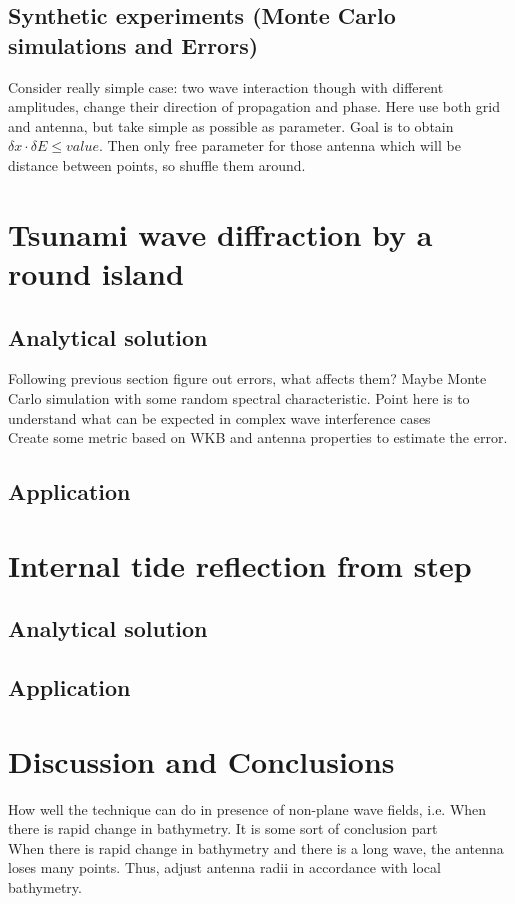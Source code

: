 \subsection{Synthetic experiments (Monte Carlo simulations and Errors)}
Consider really simple case: two wave interaction though with different amplitudes, change their direction of propagation and phase. Here use both grid and antenna, but take simple as possible as parameter. Goal is to obtain $\delta x \cdot \delta E \leq value$. Then only free parameter for those antenna which will be distance between points, so shuffle them around.

\section{Tsunami wave diffraction by a round island}
\subsection{Analytical solution}
Following previous section figure out errors, what affects them? Maybe Monte Carlo simulation with some random spectral characteristic. Point here is to understand what can be expected in complex wave interference cases\\
Create some metric based on WKB and antenna properties to estimate the error.
\subsection{Application}

\section{Internal tide reflection from step}
\subsection{Analytical solution}
\subsection{Application}

\section{Discussion and Conclusions}
How well the technique can do in presence of non-plane wave fields, i.e. When there is rapid change in bathymetry. It is some sort of conclusion part\\
When there is rapid change in bathymetry and there is a long wave, the antenna loses many points. Thus, adjust antenna radii in accordance with local bathymetry.

